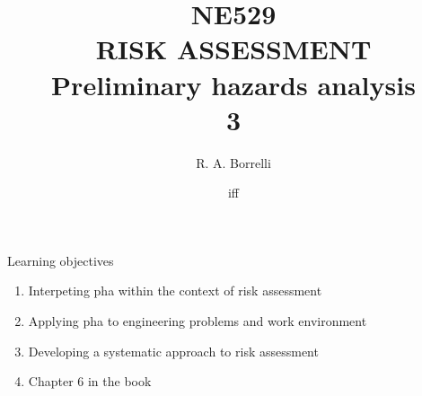 \documentclass[aspectratio=1610,pdftex,dvipsnames,compress,xcolor={dvipsnames}]{beamer}
\title[NE529 -- Risk Assessment]{NE529\\RISK ASSESSMENT\\Preliminary hazards analysis\\3}
\author[@TheDoctorRAB]{R. A. Borrelli}
\institute[]{
    \acl{ui}\\
    \vspace{0.10in}
    }
\date{\acl{iff}}
\newcommand{\acs}{\acrshort} %
\begin{document}
\nobibliography* %


{
    \begin{frame}[plain]{}
        \titlepage
    \end{frame}
}


\begin{frame}{Learning objectives}
    \begin{enumerate}[series=outerlist,topsep=0pt,itemsep=15pt,leftmargin=*,label=(\arabic*)]
        \item[]Interpeting \acs{pha} within the context of risk assessment
        \item[]Applying \acs{pha} to engineering problems and work environment
        \item[]Developing a systematic approach to risk assessment
        \item[]Chapter 6 in the book
    \end{enumerate}
\end{frame}
\end{document}
